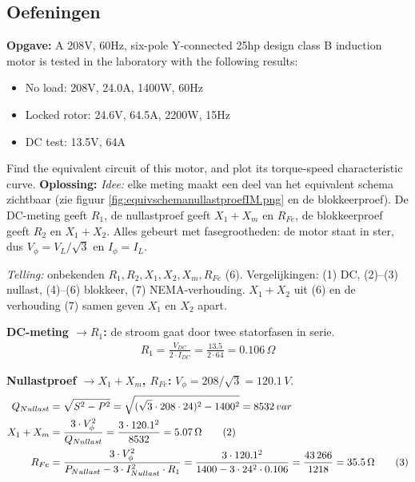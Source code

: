 \subsection{Oefeningen}

\begin{oefenblok}
    \textbf{Opgave:}
    \newline
    A 208V, 60Hz, six-pole Y-connected 25hp design class B induction motor is tested in
    the laboratory with the following results:
    \begin{itemize}
     \item No load: 208V, 24.0A, 1400W, 60Hz
     \item Locked rotor: 24.6V, 64.5A, 2200W, 15Hz
     \item DC test: 13.5V, 64A
    \end{itemize}
    Find the equivalent circuit of this motor, and plot its torque-speed characteristic
    curve.
    \newline
    \textbf{Oplossing:}
    \newline
    \textit{Idee:} elke meting maakt een deel van het equivalent schema zichtbaar (zie figuur
    \ref{fig:equivschemanullastproefIM.png} en de blokkeerproef).
    De DC-meting geeft $R_1$, de nullastproef geeft $X_1 + X_m$ en $R_{Fe}$, de
    blokkeerproef geeft $R_2$ en $X_1 + X_2$.
    Alles gebeurt met fasegrootheden: de motor staat in ster, dus $V_\phi = V_L/\sqrt{3}$
    en $I_\phi = I_L$.

    \textit{Telling:} onbekenden $R_1, R_2, X_1, X_2, X_m, R_{Fe}$ (6).
    Vergelijkingen: (1) DC, (2)--(3) nullast, (4)--(6) blokkeer, (7) NEMA-verhouding.
    $X_1 + X_2$ uit (6) en de verhouding (7) samen geven $X_1$ en $X_2$ apart.

    \textbf{DC-meting $\rightarrow R_1$:} de stroom gaat door twee statorfasen in serie.
    \begin{align}
        R_1 = \frac{V_{DC}}{2 \cdot I_{DC}} = \frac{13.5}{2 \cdot 64} = 0.106\,\Omega \tag{1}
    \end{align}

    \textbf{Nullastproef $\rightarrow X_1 + X_m$, $R_{Fe}$:}
    $V_\phi = 208/\sqrt{3} = 120.1\,V$.
    \begin{align}
        Q_{Nullast} &= \sqrt{S^2 - P^2} = \sqrt{(\sqrt{3} \cdot 208 \cdot 24)^2 - 1400^2} = 8532\,var \notag \\
        X_1 + X_m &= \frac{3 \cdot V_\phi^2}{Q_{Nullast}} = \frac{3 \cdot 120.1^2}{8532} = 5.07\,\Omega \tag{2} \\
        R_{Fe} &= \frac{3 \cdot V_\phi^2}{P_{Nullast} - 3 \cdot I_{Nullast}^2 \cdot R_1} = \frac{3 \cdot 120.1^2}{1400 - 3 \cdot 24^2 \cdot 0.106} = \frac{43\,266}{1218} = 35.5\,\Omega \tag{3}
    \end{align}


\end{oefenblok}
